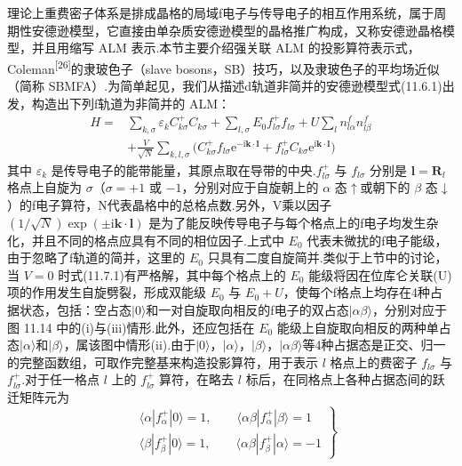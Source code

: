 理论上重费密子体系是排成晶格的局域f电子与传导电子的相互作用系统，属于周期性安德逊模型，它直接由单杂质安德逊模型的晶格推广构成，又称安德逊晶格模型，并且用缩写 ALM 表示.本节主要介绍强关联 ALM 的投影算符表示式，Coleman\textsuperscript{[26]}的隶玻色子（slave bosons，SB）技巧，以及隶玻色子的平均场近似（简称 SBMFA）.为简单起见，我们从描述d轨道非简并的安德逊模型式(11.6.1)出发，构造出下列f轨道为非简并的 ALM：
\begin{equation}
\begin{aligned}
  H={}&\sum_{k,\sigma}\varepsilon_{k}C_{k\sigma}^{+}C_{k\sigma}
  +\sum_{l,\sigma}E_{0}f_{l\sigma}^{+}f_{l\sigma}
  +U\sum_{l}n_{l\alpha}^{f}n_{l\beta}^{f}\\
  &+\frac{V}{\sqrt{N}}\sum_{k,l,\sigma}
  \bigl(C_{k\sigma}^{+}f_{l\sigma}\mathrm{e}^{-\mathrm{i}\boldsymbol{k}\cdot\boldsymbol{l}}
  +f_{l\sigma}^{+}C_{k\sigma}\mathrm{e}^{\mathrm{i}\boldsymbol{k}\cdot\boldsymbol{l}}\bigr)
\end{aligned}
\end{equation}
其中 $\varepsilon_{k}$ 是传导电子的能带能量，其原点取在导带的中央.$f_{l\sigma}^{+}$ 与 $f_{l\sigma}$ 分别是 $\boldsymbol{l}=\boldsymbol{R}_{l}$ 格点上自旋为 $\sigma$（$\sigma=+1$ 或 $-1$，分别对应于自旋朝上的 $\alpha$ 态$\uparrow$或朝下的 $\beta$ 态$\downarrow$）的f电子算符，N代表晶格中的总格点数.另外，V乘以因子 $(1/\sqrt{N})\exp(\pm\mathrm{i}\boldsymbol{k}\cdot\boldsymbol{l})$ 是为了能反映传导电子与每个格点上的f电子均发生杂化，并且不同的格点应具有不同的相位因子.上式中 $E_{0}$ 代表未微扰的f电子能级，由于忽略了f轨道的简并，这里的 $E_{0}$ 只具有二度自旋简并.类似于上节中的讨论，当 $V=0$ 时式(11.7.1)有严格解，其中每个格点上的 $E_{0}$ 能级将因在位库仑关联(U)项的作用发生自旋劈裂，形成双能级 $E_{0}$ 与 $E_{0}+U$，使每个f格点上均存在4种占据状态，包括：空占态$|0\rangle$和一对自旋取向相反的f电子的双占态$|\alpha\beta\rangle$，分别对应于图 11.14 中的(i)与(iii)情形.此外，还应包括在 $E_{0}$ 能级上自旋取向相反的两种单占态$|\alpha\rangle$和$|\beta\rangle$，属该图中情形(ii).由于$|0\rangle$，$|\alpha\rangle$，$|\beta\rangle$，$|\alpha\beta\rangle$等4种占据态是正交、归一的完整函数组，可取作完整基来构造投影算符，用于表示 $l$ 格点上的费密子 $f_{l\sigma}$ 与 $f_{l\sigma}^{+}$.对于任一格点 $l$ 上的 $f_{l\sigma}^{+}$ 算符，在略去 $l$ 标后，在同格点上各种占据态间的跃迁矩阵元为
\begin{equation}
\left.\begin{aligned}
  &\langle\alpha|f_{\alpha}^{+}|0\rangle=1,\qquad
   \langle\alpha\beta|f_{\alpha}^{+}|\beta\rangle=1\\
  &\langle\beta|f_{\beta}^{+}|0\rangle=1,\qquad
   \langle\alpha\beta|f_{\beta}^{+}|\alpha\rangle=-1
\end{aligned}\right\}
\end{equation}
